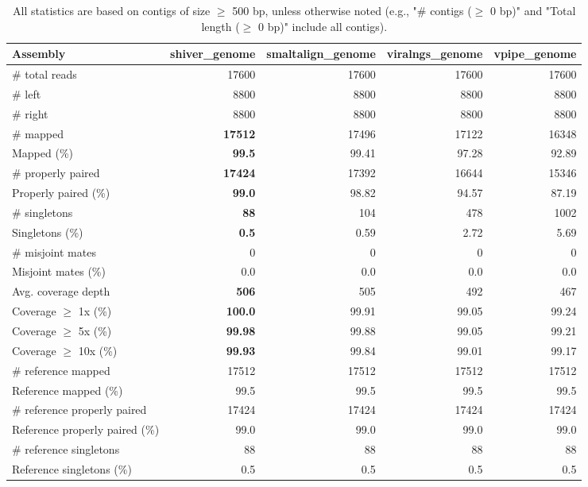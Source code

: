 \documentclass[12pt,a4paper]{article}
\begin{document}
\begin{table}[ht]
\begin{center}
\caption{All statistics are based on contigs of size $\geq$ 500 bp, unless otherwise noted (e.g., "\# contigs ($\geq$ 0 bp)" and "Total length ($\geq$ 0 bp)" include all contigs).}
\begin{tabular}{|l*{4}{|r}|}
\hline
Assembly & shiver\_genome & smaltalign\_genome & viralngs\_genome & vpipe\_genome \\ \hline
\# total reads & 17600 & 17600 & 17600 & 17600 \\ \hline
\# left & 8800 & 8800 & 8800 & 8800 \\ \hline
\# right & 8800 & 8800 & 8800 & 8800 \\ \hline
\# mapped & {\bf 17512} & 17496 & 17122 & 16348 \\ \hline
Mapped (\%) & {\bf 99.5} & 99.41 & 97.28 & 92.89 \\ \hline
\# properly paired & {\bf 17424} & 17392 & 16644 & 15346 \\ \hline
Properly paired (\%) & {\bf 99.0} & 98.82 & 94.57 & 87.19 \\ \hline
\# singletons & {\bf 88} & 104 & 478 & 1002 \\ \hline
Singletons (\%) & {\bf 0.5} & 0.59 & 2.72 & 5.69 \\ \hline
\# misjoint mates & 0 & 0 & 0 & 0 \\ \hline
Misjoint mates (\%) & 0.0 & 0.0 & 0.0 & 0.0 \\ \hline
Avg. coverage depth & {\bf 506} & 505 & 492 & 467 \\ \hline
Coverage $\geq$ 1x (\%) & {\bf 100.0} & 99.91 & 99.05 & 99.24 \\ \hline
Coverage $\geq$ 5x (\%) & {\bf 99.98} & 99.88 & 99.05 & 99.21 \\ \hline
Coverage $\geq$ 10x (\%) & {\bf 99.93} & 99.84 & 99.01 & 99.17 \\ \hline
\# reference mapped & 17512 & 17512 & 17512 & 17512 \\ \hline
Reference mapped (\%) & 99.5 & 99.5 & 99.5 & 99.5 \\ \hline
\# reference properly paired & 17424 & 17424 & 17424 & 17424 \\ \hline
Reference properly paired (\%) & 99.0 & 99.0 & 99.0 & 99.0 \\ \hline
\# reference singletons & 88 & 88 & 88 & 88 \\ \hline
Reference singletons (\%) & 0.5 & 0.5 & 0.5 & 0.5 \\ \hline

\end{tabular}
\end{center}
\end{table}
\end{document}
